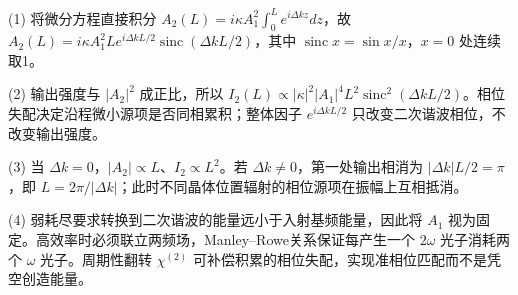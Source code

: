 (1) 将微分方程直接积分 \(A_2(L)=i\kappa A_1^2\int_0^Le^{i\Delta kz}dz\)，故 \(\boxed{A_2(L)=i\kappa A_1^2Le^{i\Delta kL/2}\operatorname{sinc}(\Delta kL/2)}\)，其中 \(\operatorname{sinc}x=\sin x/x\)，\(x=0\) 处连续取1。

(2) 输出强度与 \(|A_2|^2\) 成正比，所以 \(\boxed{I_2(L)\propto|\kappa|^2|A_1|^4L^2\operatorname{sinc}^2(\Delta kL/2)}\)。相位失配决定沿程微小源项是否同相累积；整体因子 \(e^{i\Delta kL/2}\) 只改变二次谐波相位，不改变输出强度。

(3) 当 \(\Delta k=0\)，\(|A_2|\propto L\)、\(I_2\propto L^2\)。若 \(\Delta k\ne0\)，第一处输出相消为 \(|\Delta k|L/2=\pi\)，即 \(\boxed{L=2\pi/|\Delta k|}\)；此时不同晶体位置辐射的相位源项在振幅上互相抵消。

(4) 弱耗尽要求转换到二次谐波的能量远小于入射基频能量，因此将 \(A_1\) 视为固定。高效率时必须联立两频场，Manley–Rowe关系保证每产生一个 \(2\omega\) 光子消耗两个 \(\omega\) 光子。周期性翻转 \(\chi^{(2)}\) 可补偿积累的相位失配，实现准相位匹配而不是凭空创造能量。
